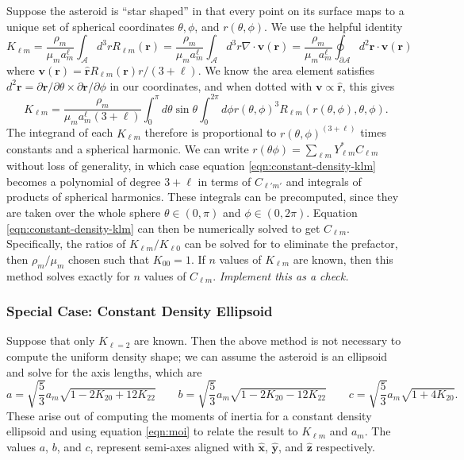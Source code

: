 \documentclass{aastex631}
\newcommand{\unit}[1]{\hat{\mathbf{#1}}}
\newcommand{\jtd}[1]{{\color{red}\textit{#1}}}
\begin{document}
Suppose the asteroid is ``star shaped'' in that every point on its surface maps to a unique set of spherical coordinates $\theta, \phi$, and $r(\theta, \phi)$. We use the helpful identity
\begin{equation}
  K_{\ell m} = \frac{\rho_m}{\mu_m a_m^\ell} \int_\mathcal{A} d^3 r R_{\ell m} (\mathbf r)
   = \frac{\rho_m}{\mu_m a_m^\ell} \int_\mathcal{A} d^3 r \nabla \cdot \mathbf v (\mathbf r)
    = \frac{\rho_m}{\mu_m a_m^\ell} \oint_{\partial \mathcal{A}} d^2 \mathbf r \cdot \mathbf v (\mathbf r)
\end{equation}
where $\mathbf v (\mathbf r) = \unit r R_{\ell m} (\mathbf r) r / (3+\ell) $. We know the area element satisfies $d^2 \mathbf r = \partial \mathbf r / \partial \theta \times \partial \mathbf r / \partial \phi$ in our coordinates, and when dotted with $\mathbf v \propto \unit r$, this gives
\begin{equation}
  K_{\ell m} = \frac{\rho_m}{\mu_m a_m^\ell(3 + \ell)} \int_0^\pi d\theta \sin \theta\int_0^{2\pi}d\phi r(\theta, \phi)^3 R_{\ell m}(r(\theta, \phi), \theta, \phi).
  \label{eqn:constant-density-klm}
\end{equation}
The integrand of each $K_{\ell m}$ therefore is proportional to $r(\theta, \phi)^(3+\ell)$ times constants and a spherical harmonic. We can write $r(\theta \phi) = \sum_{\ell m} Y_{\ell m}^* C_{\ell m}$ without loss of generality, in which case equation \ref{eqn:constant-density-klm} becomes a polynomial of degree $3+\ell$ in terms of $C_{\ell' m'}$ and integrals of products of spherical harmonics. These integrals can be precomputed, since they are taken over the whole sphere $\theta \in (0, \pi)$ and $\phi \in (0, 2\pi)$. Equation \ref{eqn:constant-density-klm} can then be numerically solved to get $C_{\ell m}$. Specifically, the ratios of $K_{\ell m} / K_{\ell 0}$ can be solved for to eliminate the prefactor, then $\rho_m / \mu_m$ chosen such that $K_{00} = 1$. If $n$ values of $K_{\ell m}$ are known, then this method solves exactly for $n$ values of $C_{\ell m}$.
\jtd{Implement this as a check.}


\subsubsection{Special Case: Constant Density Ellipsoid}
\label{sec:constant-density-ellipsoid}
Suppose that only $K_{\ell = 2}$ are known. Then the above method is not necessary to compute the uniform density shape; we can assume the asteroid is an ellipsoid and solve for the axis lengths, which are
\begin{equation}
a = \sqrt{\frac{5}{3}}a_m\sqrt{1-2K_{20}+12K_{22}} \qquad b = \sqrt{\frac{5}{3}}a_m\sqrt{1-2K_{20}-12K_{22}} \qquad c = \sqrt{\frac{5}{3}}a_m\sqrt{1+4K_{20}}.
\label{eqn:ellipsoid-klm}
\end{equation}
These arise out of computing the moments of inertia for a constant density ellipsoid and using equation \ref{eqn:moi} to relate the result to $K_{\ell m}$ and $a_m$. The values $a$, $b$, and $c$, represent semi-axes aligned with $\unit x$, $\unit y$, and $\unit z$ respectively.
\end{document}
